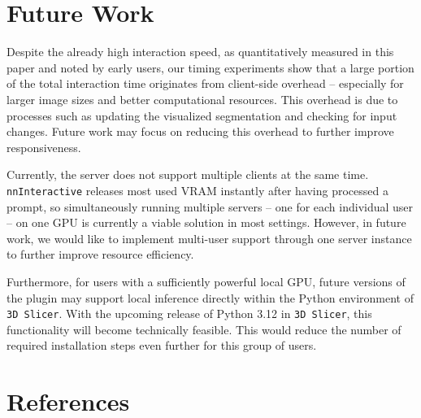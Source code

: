 \documentclass[
]{article}
\begin{document}
\section{Future Work}\label{future-work}

Despite the already high interaction speed, as quantitatively measured
in this paper and noted by early users, our timing experiments show that
a large portion of the total interaction time originates from
client-side overhead -- especially for larger image sizes and better
computational resources. This overhead is due to processes such as
updating the visualized segmentation and checking for input changes.
Future work may focus on reducing this overhead to further improve
responsiveness.

Currently, the server does not support multiple clients at the same
time. \texttt{nnInteractive} releases most used VRAM instantly after
having processed a prompt, so simultaneously running multiple servers --
one for each individual user -- on one GPU is currently a viable
solution in most settings. However, in future work, we would like to
implement multi-user support through one server instance to further
improve resource efficiency.

Furthermore, for users with a sufficiently powerful local GPU, future
versions of the plugin may support local inference directly within the
Python environment of \texttt{3D\ Slicer}. With the upcoming release of
Python 3.12 in \texttt{3D\ Slicer}, this functionality will become
technically feasible. This would reduce the number of required
installation steps even further for this group of users.

\section*{References}\label{references}
\end{document}
